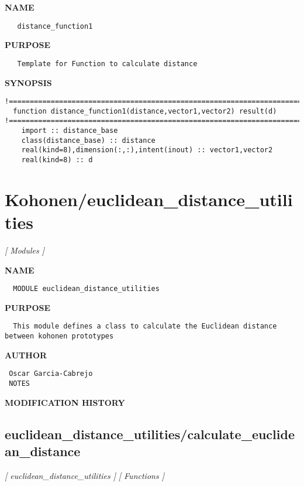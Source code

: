 \documentclass{article}
\begin{document}
\label{ch:robo11}
\label{ch:distance_base_utilities_distance_function1}
\textbf{NAME}
\begin{verbatim}
   distance_function1
\end{verbatim}
\textbf{PURPOSE}
\begin{verbatim}
   Template for Function to calculate distance 
\end{verbatim}
\textbf{SYNOPSIS}
\begin{verbatim}
!========================================================================================
  function distance_function1(distance,vector1,vector2) result(d)
!========================================================================================
    import :: distance_base
    class(distance_base) :: distance
    real(kind=8),dimension(:,:),intent(inout) :: vector1,vector2
    real(kind=8) :: d
\end{verbatim}
\newpage
\section{Kohonen/euclidean\_distance\_utilities}
\textsl{[ Modules ]}

\label{ch:robo1}
\label{ch:Kohonen_euclidean_distance_utilities}
\textbf{NAME}
\begin{verbatim}
  MODULE euclidean_distance_utilities
\end{verbatim}
\textbf{PURPOSE}
\begin{verbatim}
  This module defines a class to calculate the Euclidean distance between kohonen prototypes 
\end{verbatim}
\textbf{AUTHOR}
\begin{verbatim}
 Oscar Garcia-Cabrejo
 NOTES 
\end{verbatim}
\textbf{MODIFICATION HISTORY}
\newpage
\subsection{euclidean\_distance\_utilities/calculate\_euclidean\_distance}
\textsl{[ euclidean\_distance\_utilities ]}
\textsl{[ Functions ]}
\end{document}
